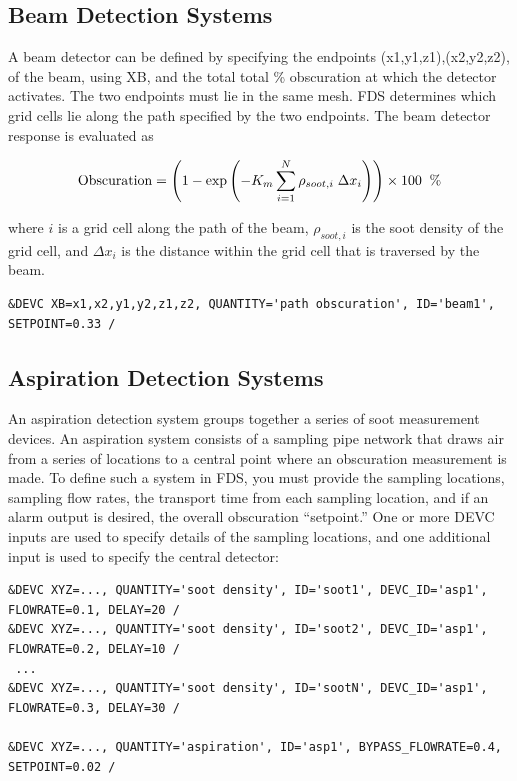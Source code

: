 \documentclass[11pt]{book}
\newcommand{\be}{\begin{equation}}
\newcommand{\ee}{\end{equation}}
\begin{document}
\subsection{Beam Detection Systems}
\label{info:beam_detector}

A beam detector can be defined by specifying the endpoints {\ct (x1,y1,z1),(x2,y2,z2)}, of the beam, using {\ct XB}, and the total
total \% obscuration at which the detector activates.  The two endpoints must lie in the same mesh.  FDS determines which grid
cells lie along the path specified by the two endpoints.  The beam detector response is evaluated as

\be
  \hbox{Obscuration}  = \left(1 - \exp \left( -K_m \sum_{i=1}^N {\rho_{soot,i}\; \Delta x_i} \right)  \right) \times 100  \; \; \hbox{\%}
\ee

\noindent
where $i$ is a grid cell along the path of the beam, $\rho_{soot,i}$ is the soot density of the grid cell, and $ \Delta x_i$
is the distance within the grid cell that is traversed by the beam.

\footnotesize
\begin{verbatim}
&DEVC XB=x1,x2,y1,y2,z1,z2, QUANTITY='path obscuration', ID='beam1', SETPOINT=0.33 /
\end{verbatim}
\normalsize

\subsection{Aspiration Detection Systems}
\label{info:aspiration_detector}
An aspiration detection system groups together a series of soot measurement devices.
An aspiration system consists of a sampling pipe network that draws air from a series of locations to a central point
where an obscuration measurement is made.  To define such a system in FDS, you must provide the sampling locations,
sampling flow rates, the transport time from each sampling location, and if an alarm output is desired, the overall obscuration
``setpoint.''  One or more {\ct DEVC} inputs are used to specify details of the sampling locations, and one additional input is
used to specify the central detector:

\footnotesize
\begin{verbatim}
&DEVC XYZ=..., QUANTITY='soot density', ID='soot1', DEVC_ID='asp1', FLOWRATE=0.1, DELAY=20 /
&DEVC XYZ=..., QUANTITY='soot density', ID='soot2', DEVC_ID='asp1', FLOWRATE=0.2, DELAY=10 /
 ...
&DEVC XYZ=..., QUANTITY='soot density', ID='sootN', DEVC_ID='asp1', FLOWRATE=0.3, DELAY=30 /

&DEVC XYZ=..., QUANTITY='aspiration', ID='asp1', BYPASS_FLOWRATE=0.4, SETPOINT=0.02 /
\end{verbatim}
\normalsize
\end{document}
